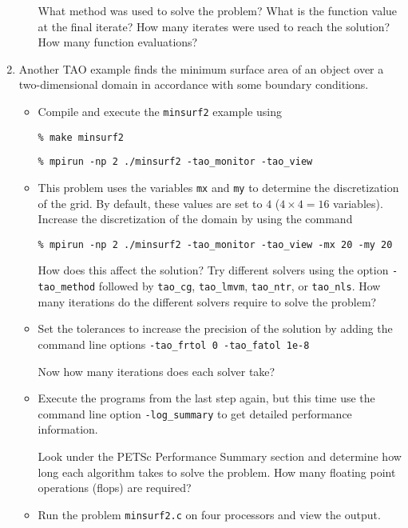 \documentclass[11pt]{article}
\begin{document}
\begin{enumerate}
\begin{itemize}
  What method was used to solve the problem?
  What is the function value at the final iterate? 
  How many iterates were used to reach the solution?  
  How many function evaluations?

 \newpage

\end{itemize}

\item
Another TAO example finds the minimum surface area of an object over a
two-dimensional domain in accordance with some boundary conditions.

\begin{itemize}

\item
Compile and execute the \texttt{minsurf2} example using
    
\texttt{\% make minsurf2}

\texttt{\% mpirun -np 2 ./minsurf2 -tao\_monitor -tao\_view}

\item
This problem uses the variables {\tt mx} and {\tt my} to determine
the discretization of the grid.  By default, these values are set to
$4$ ($4 \times 4 = 16$ variables). Increase the discretization of the 
domain by using the command 

\texttt{\% mpirun -np 2 ./minsurf2 -tao\_monitor -tao\_view -mx 20 -my 20}

How does this affect the solution?
Try different solvers using the option \texttt{-tao\_method} followed by
\texttt{tao\_cg},
\texttt{tao\_lmvm}, \texttt{tao\_ntr}, or \texttt{tao\_nls}.
How many iterations do the different solvers require to solve the problem?

\item
Set the tolerances to increase the precision of the solution by adding the
command line options \texttt{-tao\_frtol 0 -tao\_fatol 1e-8}

Now how many iterations does each solver take?

\item
Execute the programs from the last step again, but this time use the command line option 
\texttt{-log\_summary} to get detailed performance information.

Look under the PETSc Performance Summary section and determine how long
each algorithm takes to solve the problem. How many floating point operations (flops) are required? 


\item
Run the problem \texttt{minsurf2.c} on four processors and view the output.


\end{itemize}
\end{enumerate}
\end{document}
